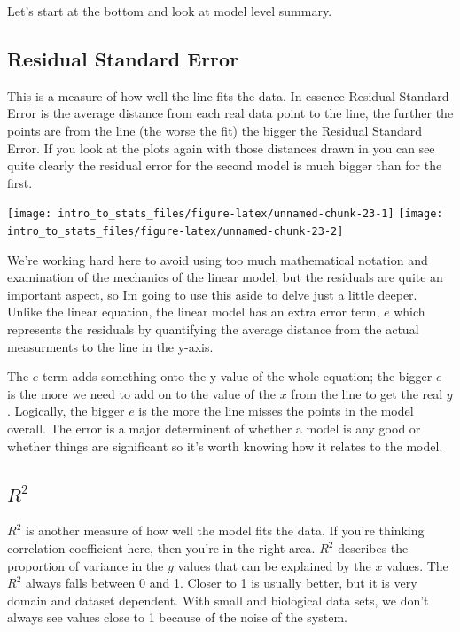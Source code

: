 \documentclass[
]{book}
\newenvironment{sidenote}
{ \begin{tcolorbox}[colbacktitle=blue!50!white,
title=huh?,coltitle=white,
fonttitle=\bfseries] }
{  \end{tcolorbox} }
\begin{document}
Let's start at the bottom and look at model level summary.

\hypertarget{residual-standard-error}{%
\subsection{Residual Standard Error}\label{residual-standard-error}}

This is a measure of how well the line fits the data. In essence Residual Standard Error is the average distance from each real data point to the line, the further the points are from the line (the worse the fit) the bigger the Residual Standard Error. If you look at the plots again with those distances drawn in you can see quite clearly the residual error for the second model is much bigger than for the first.

\texttt{[image: intro\_to\_stats\_files/figure-latex/unnamed-chunk-23-1]} \texttt{[image: intro\_to\_stats\_files/figure-latex/unnamed-chunk-23-2]}

\begin{sidenote}
We're working hard here to avoid using too much mathematical notation and examination of the mechanics of the linear model, but the residuals are quite an important aspect, so Im going to use this aside to delve just a little deeper. Unlike the linear equation, the linear model has an extra error term, \(e\) which represents the residuals by quantifying the average distance from the actual measurments to the line in the y-axis.

The \(e\) term adds something onto the y value of the whole equation; the bigger \(e\) is the more we need to add on to the value of the \(x\) from the line to get the real \(y\). Logically, the bigger \(e\) is the more the line misses the points in the model overall. The error is a major determinent of whether a model is any good or whether things are significant so it's worth knowing how it relates to the model.
\end{sidenote}

\hypertarget{r2}{%
\subsection{\texorpdfstring{\(R^2\)}{R\^{}2}}\label{r2}}

\(R^2\) is another measure of how well the model fits the data. If you're thinking correlation coefficient here, then you're in the right area. \(R^2\) describes the proportion of variance in the \(y\) values that can be explained by the \(x\) values. The \(R^2\) always falls between 0 and 1. Closer to 1 is usually better, but it is very domain and dataset dependent. With small and biological data sets, we don't always see values close to 1 because of the noise of the system.
\end{document}
